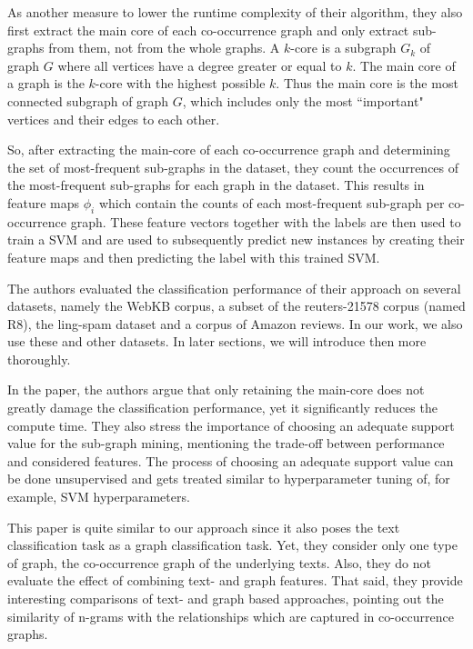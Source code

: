 As another measure to lower the runtime complexity of their algorithm, they also first extract the main core of each co-occurrence graph and only extract sub-graphs from them, not from the whole graphs.
A $k$-core is a subgraph $G_k$ of graph $G$ where all vertices have a degree greater or equal to $k$. The main core of a graph is the $k$-core with the highest possible $k$.
Thus the main core is the most connected subgraph of graph $G$, which includes only the most ``important" vertices and their edges to each other.

So, after extracting the main-core of each co-occurrence graph and determining the set of most-frequent sub-graphs in the dataset, they count the occurrences of the most-frequent sub-graphs for each graph in the dataset.
This results in feature maps $\phi_i$ which contain the counts of each most-frequent sub-graph per co-occurrence graph.
These feature vectors together with the labels are then used to train a SVM and are used to subsequently predict new instances by creating their feature maps and then predicting the label with this trained SVM.

The authors evaluated the classification performance of their approach on several datasets, namely the WebKB corpus, a subset of the reuters-21578 corpus (named R8), the ling-spam dataset and a corpus of Amazon reviews.
In our work, we also use these and other datasets. In later sections, we will introduce then more thoroughly.

In the paper, the authors argue that only retaining the main-core does not greatly damage the classification performance, yet it significantly reduces the compute time.
They also stress the importance of choosing an adequate support value for the sub-graph mining, mentioning the trade-off between performance and considered features. The process of choosing an adequate support value can be done unsupervised and gets treated similar to hyperparameter tuning of, for example, SVM hyperparameters.

This paper is quite similar to our approach since it also poses the text classification task as a graph classification task. Yet, they consider only one type of graph, the co-occurrence graph of the underlying texts.
Also, they do not evaluate the effect of combining text- and graph features.
That said, they provide interesting comparisons of text- and graph based approaches, pointing out the similarity of n-grams with the relationships which are captured in co-occurrence graphs.

